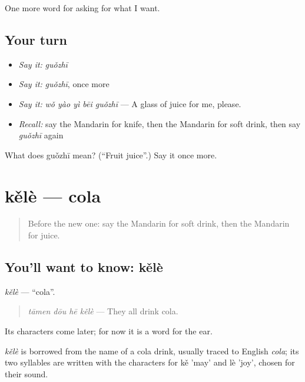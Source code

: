 \begin{grammarlens}[title={What you've built}]
One more word for asking for what I want.
\end{grammarlens}

\subsection*{Your turn}
\begin{itemize}
\raggedright
  \item \emph{Say it:} \emph{guǒzhī}
  \item \emph{Say it:} \emph{guǒzhī}, once more
  \item \emph{Say it:} \emph{wǒ yào yì bēi guǒzhī} — A glass of juice for me, please.
  \item \emph{Recall:} say the Mandarin for knife, then the Mandarin for soft drink, then say \emph{guǒzhī} again
\end{itemize}

\begin{tcolorbox}[breakable,colback=teal!4,colframe=teal!35!black,title={Before you move on}]
What does guǒzhī mean? (\textquotedblleft{}Fruit juice\textquotedblright{}.) Say it once more.
\end{tcolorbox}
\section[kělè]{kělè — cola}

\label{lesson:ZH-C102-kele}



\begin{quote}
Before the new one: say the Mandarin for soft drink, then the Mandarin for juice.
\end{quote}

\subsection*{You'll want to know: kělè}
\emph{kělè} — \textquotedblleft{}cola\textquotedblright{}.

\begin{quote}
\emph{tāmen dōu hē kělè} — They all drink cola.
\end{quote}

Its characters come later; for now it is a word for the ear.

\begin{cousinweb}
\emph{kělè} is borrowed from the name of a cola drink, usually traced to English \emph{cola}; its two syllables are written with the characters for kě 'may' and lè 'joy', chosen for their sound.
\end{cousinweb}

